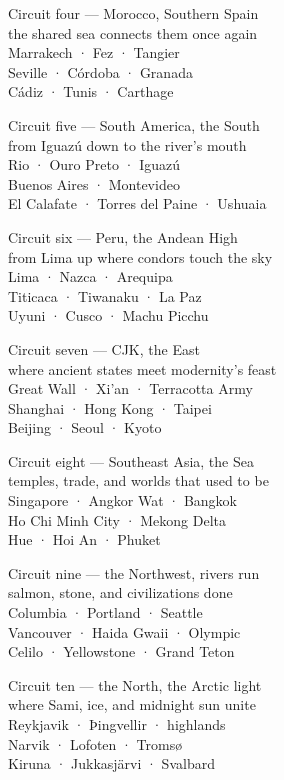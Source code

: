 \begin{lyrics}
Circuit four — Morocco, Southern Spain\\
the shared sea connects them once again
\\
Marrakech · Fez · Tangier\\
Seville · Córdoba · Granada\\
Cádiz · Tunis · Carthage


Circuit five — South America, the South\\
from Iguazú down to the river's mouth
\\
Rio · Ouro Preto · Iguazú\\
Buenos Aires · Montevideo\\
El Calafate · Torres del Paine · Ushuaia

Circuit six — Peru, the Andean High\\
from Lima up where condors touch the sky 
\\
Lima · Nazca · Arequipa\\
Titicaca · Tiwanaku · La Paz\\
Uyuni · Cusco · Machu Picchu


Circuit seven — CJK, the East\\
where ancient states meet modernity's feast  
\\
Great Wall · Xi'an · Terracotta Army\\
Shanghai · Hong Kong · Taipei\\
Beijing · Seoul · Kyoto

Circuit eight — Southeast Asia, the Sea\\
temples, trade, and worlds that used to be 
\\
Singapore · Angkor Wat · Bangkok\\
Ho Chi Minh City · Mekong Delta\\
Hue · Hoi An · Phuket


Circuit nine — the Northwest, rivers run\\
salmon, stone, and civilizations done   
\\
Columbia · Portland · Seattle\\
Vancouver · Haida Gwaii · Olympic\\
Celilo · Yellowstone · Grand Teton

Circuit ten — the North, the Arctic light\\
where Sami, ice, and midnight sun unite 
\\
Reykjavik · Þingvellir · highlands\\
Narvik · Lofoten · Tromsø\\
Kiruna · Jukkasjärvi · Svalbard

\end{lyrics}

